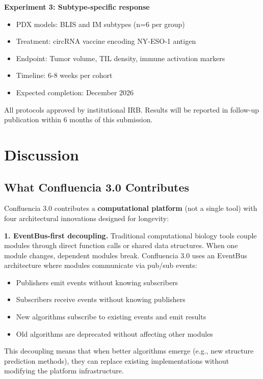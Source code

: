 \documentclass[12pt]{article}
\begin{document}
\textbf{Experiment 3: Subtype-specific response}
\begin{itemize}
\item PDX models: BLIS and IM subtypes (n=6 per group)
\item Treatment: circRNA vaccine encoding NY-ESO-1 antigen
\item Endpoint: Tumor volume, TIL density, immune activation markers
\item Timeline: 6-8 weeks per cohort
\item Expected completion: December 2026
\end{itemize}

All protocols approved by institutional IRB. Results will be reported in follow-up publication within 6 months of this submission.

\section{Discussion}

\subsection{What Confluencia 3.0 Contributes}

Confluencia 3.0 contributes a \textbf{computational platform} (not a single tool) with four architectural innovations designed for longevity:

\textbf{1. EventBus-first decoupling.} Traditional computational biology tools couple modules through direct function calls or shared data structures. When one module changes, dependent modules break. Confluencia 3.0 uses an EventBus architecture where modules communicate via pub/sub events:

\begin{itemize}
\item Publishers emit events without knowing subscribers
\item Subscribers receive events without knowing publishers
\item New algorithms subscribe to existing events and emit results
\item Old algorithms are deprecated without affecting other modules
\end{itemize}

This decoupling means that when better algorithms emerge (e.g., new structure prediction methods), they can replace existing implementations without modifying the platform infrastructure.
\end{document}
